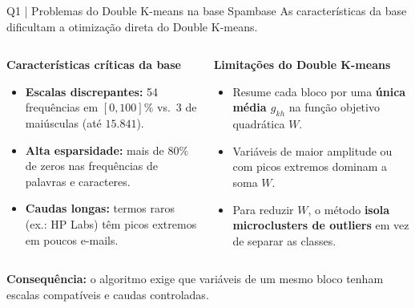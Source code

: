 \documentclass[aspectratio=169,11pt]{beamer}
\begin{document}
\begin{frame}[t]{Q1 | Problemas do Double K-means na base Spambase}
\small\color{cinzaescuro}As características da base dificultam a otimização direta do Double K-means.
\vspace{1mm}
\begin{columns}[T,onlytextwidth]
\begin{simplebox}
\textbf{Características críticas da base}\par\vspace{1mm}
\footnotesize
\begin{itemize}\setlength\itemsep{1.2mm}
\item \textbf{Escalas discrepantes:} 54 frequências em $[0,100]\%$ vs.\ 3 de maiúsculas (até $15.841$).
\item \textbf{Alta esparsidade:} mais de $80\%$ de zeros nas frequências de palavras e caracteres.
\item \textbf{Caudas longas:} termos raros (ex.: HP Labs) têm picos extremos em poucos e-mails.
\end{itemize}
\end{simplebox}
\begin{simplebox}
\textbf{Limitações do Double K-means}\par\vspace{1mm}
\footnotesize
\begin{itemize}\setlength\itemsep{1.2mm}
\item Resume cada bloco por uma \textbf{única média $g_{kh}$} na função objetivo quadrática $W$.
\item Variáveis de maior amplitude ou com picos extremos dominam a soma $W$.
\item Para reduzir $W$, o método \textbf{isola microclusters de outliers} em vez de separar as classes.
\end{itemize}
\end{simplebox}
\end{columns}
\vspace{1mm}
{\footnotesize\color{laranja}\textbf{Consequência:} o algoritmo exige que variáveis de um mesmo bloco tenham escalas compatíveis e caudas controladas.}
\end{frame}
\end{document}
